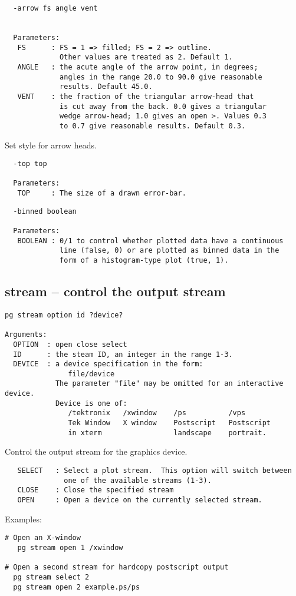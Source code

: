 \begin{verbatim}
  -arrow fs angle vent


  Parameters:
   FS      : FS = 1 => filled; FS = 2 => outline.
             Other values are treated as 2. Default 1.
   ANGLE   : the acute angle of the arrow point, in degrees;
             angles in the range 20.0 to 90.0 give reasonable
             results. Default 45.0.
   VENT    : the fraction of the triangular arrow-head that
             is cut away from the back. 0.0 gives a triangular
             wedge arrow-head; 1.0 gives an open >. Values 0.3
             to 0.7 give reasonable results. Default 0.3.
\end{verbatim}
Set style for arrow heads.

\begin{verbatim}
  -top top

  Parameters:
   TOP     : The size of a drawn error-bar.
\end{verbatim}

\begin{verbatim}
  -binned boolean

  Parameters:
   BOOLEAN : 0/1 to control whether plotted data have a continuous
             line (false, 0) or are plotted as binned data in the
             form of a histogram-type plot (true, 1).
\end{verbatim}

\subsection{stream -- control the output stream}
\begin{verbatim}
pg stream option id ?device?

Arguments:
  OPTION  : open close select
  ID      : the steam ID, an integer in the range 1-3.
  DEVICE  : a device specification in the form:
               file/device
            The parameter "file" may be omitted for an interactive device.
            Device is one of:
               /tektronix   /xwindow    /ps          /vps
               Tek Window   X window    Postscript   Postscript
               in xterm                 landscape    portrait.
\end{verbatim}
Control the output stream for the graphics device.
\begin{verbatim}
   SELECT   : Select a plot stream.  This option will switch between
              one of the available streams (1-3).
   CLOSE    : Close the specified stream
   OPEN     : Open a device on the currently selected stream.  
\end{verbatim}
Examples:
\begin{verbatim}
# Open an X-window
   pg stream open 1 /xwindow

# Open a second stream for hardcopy postscript output
  pg stream select 2
  pg stream open 2 example.ps/ps
\end{verbatim}

